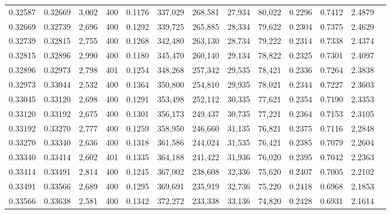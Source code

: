 \begin{tabular}{rrrrrrrrrrrrr}
0.32587 & 0.32669 &  3,002 & 400 &                                     0.1176 & 337,029 & 268,581 &  27,934 &  80,022 & 0.2296 & 0.7412 & 2.4879 \\
0.32669 & 0.32739 &  2,696 & 400 &                                     0.1292 & 339,725 & 265,885 &  28,334 &  79,622 & 0.2304 & 0.7375 & 2.4629 \\
0.32739 & 0.32815 &  2,755 & 400 &                                     0.1268 & 342,480 & 263,130 &  28,734 &  79,222 & 0.2314 & 0.7338 & 2.4374 \\
0.32815 & 0.32896 &  2,990 & 400 &                                     0.1180 & 345,470 & 260,140 &  29,134 &  78,822 & 0.2325 & 0.7301 & 2.4097 \\
0.32896 & 0.32973 &  2,798 & 401 &                                     0.1254 & 348,268 & 257,342 &  29,535 &  78,421 & 0.2336 & 0.7264 & 2.3838 \\
0.32973 & 0.33044 &  2,532 & 400 &                                     0.1364 & 350,800 & 254,810 &  29,935 &  78,021 & 0.2344 & 0.7227 & 2.3603 \\
0.33045 & 0.33120 &  2,698 & 400 &                                     0.1291 & 353,498 & 252,112 &  30,335 &  77,621 & 0.2354 & 0.7190 & 2.3353 \\
0.33120 & 0.33192 &  2,675 & 400 &                                     0.1301 & 356,173 & 249,437 &  30,735 &  77,221 & 0.2364 & 0.7153 & 2.3105 \\
0.33192 & 0.33270 &  2,777 & 400 &                                     0.1259 & 358,950 & 246,660 &  31,135 &  76,821 & 0.2375 & 0.7116 & 2.2848 \\
0.33270 & 0.33340 &  2,636 & 400 &                                     0.1318 & 361,586 & 244,024 &  31,535 &  76,421 & 0.2385 & 0.7079 & 2.2604 \\
0.33340 & 0.33414 &  2,602 & 401 &                                     0.1335 & 364,188 & 241,422 &  31,936 &  76,020 & 0.2395 & 0.7042 & 2.2363 \\
0.33414 & 0.33491 &  2,814 & 400 &                                     0.1245 & 367,002 & 238,608 &  32,336 &  75,620 & 0.2407 & 0.7005 & 2.2102 \\
0.33491 & 0.33566 &  2,689 & 400 &                                     0.1295 & 369,691 & 235,919 &  32,736 &  75,220 & 0.2418 & 0.6968 & 2.1853 \\
0.33566 & 0.33638 &  2,581 & 400 &                                     0.1342 & 372,272 & 233,338 &  33,136 &  74,820 & 0.2428 & 0.6931 & 2.1614 \\

\end{tabular}
